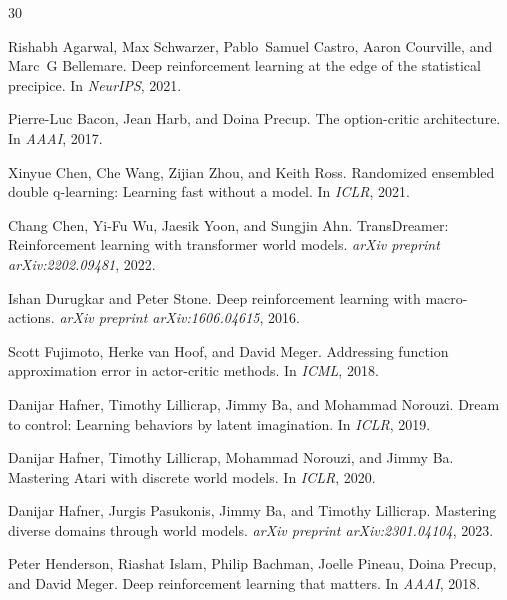\documentclass[10pt,letterpaper]{article}
\begin{document}
\begin{thebibliography}{30}

Rishabh Agarwal, Max Schwarzer, Pablo~Samuel Castro, Aaron Courville, and Marc~G Bellemare.
\newblock Deep reinforcement learning at the edge of the statistical precipice.
\newblock In \emph{NeurIPS}, 2021.

Pierre-Luc Bacon, Jean Harb, and Doina Precup.
\newblock The option-critic architecture.
\newblock In \emph{AAAI}, 2017.

Xinyue Chen, Che Wang, Zijian Zhou, and Keith Ross.
\newblock Randomized ensembled double q-learning: Learning fast without a model.
\newblock In \emph{ICLR}, 2021.

Chang Chen, Yi-Fu Wu, Jaesik Yoon, and Sungjin Ahn.
\newblock TransDreamer: Reinforcement learning with transformer world models.
\newblock \emph{arXiv preprint arXiv:2202.09481}, 2022.

Ishan Durugkar and Peter Stone.
\newblock Deep reinforcement learning with macro-actions.
\newblock \emph{arXiv preprint arXiv:1606.04615}, 2016.

Scott Fujimoto, Herke van Hoof, and David Meger.
\newblock Addressing function approximation error in actor-critic methods.
\newblock In \emph{ICML}, 2018.

Danijar Hafner, Timothy Lillicrap, Jimmy Ba, and Mohammad Norouzi.
\newblock Dream to control: Learning behaviors by latent imagination.
\newblock In \emph{ICLR}, 2019.

Danijar Hafner, Timothy Lillicrap, Mohammad Norouzi, and Jimmy Ba.
\newblock Mastering {A}tari with discrete world models.
\newblock In \emph{ICLR}, 2020.

Danijar Hafner, Jurgis Pasukonis, Jimmy Ba, and Timothy Lillicrap.
\newblock Mastering diverse domains through world models.
\newblock \emph{arXiv preprint arXiv:2301.04104}, 2023.

Peter Henderson, Riashat Islam, Philip Bachman, Joelle Pineau, Doina Precup, and David Meger.
\newblock Deep reinforcement learning that matters.
\newblock In \emph{AAAI}, 2018.


\end{thebibliography}
\end{document}
